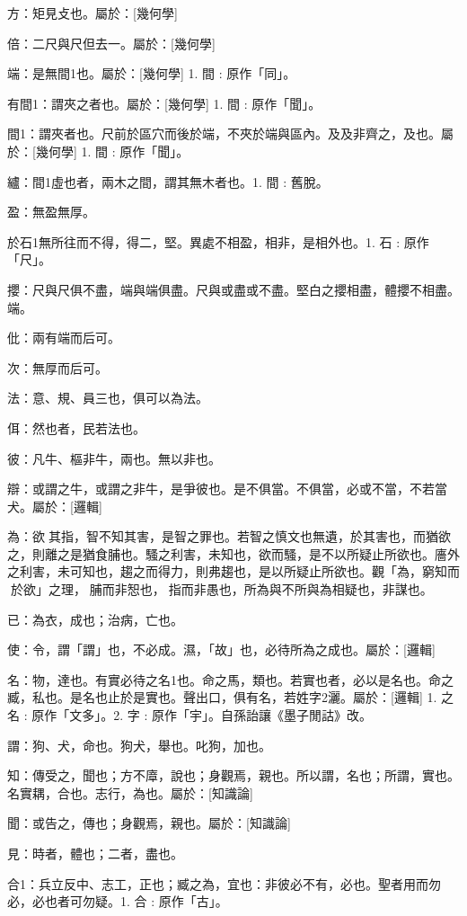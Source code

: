 \begin{pinyinscope}
方：矩見攴也。屬於：[幾何學]

倍：二尺與尺但去一。屬於：[幾何學]

端：是無間1也。屬於：[幾何學] 
1. 間 : 原作「同」。

有間1：謂夾之者也。屬於：[幾何學] 
1. 間 : 原作「聞」。

間1：謂夾者也。尺前於區穴而後於端，不夾於端與區內。及及非齊之，及也。屬於：[幾何學] 
1. 間 : 原作「聞」。

纑：間1虛也者，兩木之間，謂其無木者也。1. 間 : 舊脫。

盈：無盈無厚。

於石1無所往而不得，得二，堅。異處不相盈，相非，是相外也。1. 石 : 原作「尺」。

攖：尺與尺俱不盡，端與端俱盡。尺與或盡或不盡。堅白之攖相盡，體攖不相盡。端。

仳：兩有端而后可。

次：無厚而后可。

法：意、規、員三也，俱可以為法。

佴：然也者，民若法也。



彼：凡牛、樞非牛，兩也。無以非也。

辯：或謂之牛，或謂之非牛，是爭彼也。是不俱當。不俱當，必或不當，不若當犬。屬於：[邏輯]

為：欲𩁥其指，智不知其害，是智之罪也。若智之慎文也無遺，於其害也，而猶欲𩁥之，則離之是猶食脯也。騷之利害，未知也，欲而騷，是不以所疑止所欲也。廧外之利害，未可知也，趨之而得力，則弗趨也，是以所疑止所欲也。觀「為，窮知而𠐴於欲」之理，𩁥脯而非𢜔也，𩁥指而非愚也，所為與不所與為相疑也，非謀也。

已：為衣，成也；治病，亡也。

使：令，謂「謂」也，不必成。濕，「故」也，必待所為之成也。屬於：[邏輯]

名：物，達也。有實必待之名1也。命之馬，類也。若實也者，必以是名也。命之臧，私也。是名也止於是實也。聲出口，俱有名，若姓字2灑。屬於：[邏輯] 
1. 之名 : 原作「文多」。2. 字 : 原作「宇」。自孫詒讓《墨子閒詁》改。

謂：狗、犬，命也。狗犬，舉也。叱狗，加也。

知：傳受之，聞也；方不㢓，說也；身觀焉，親也。所以謂，名也；所謂，實也。名實耦，合也。志行，為也。屬於：[知識論]

聞：或告之，傳也；身觀焉，親也。屬於：[知識論]

見：時者，體也；二者，盡也。

合1：兵立反中、志工，正也；臧之為，宜也：非彼必不有，必也。聖者用而勿必，必也者可勿疑。1. 合 : 原作「古」。


\end{pinyinscope}
